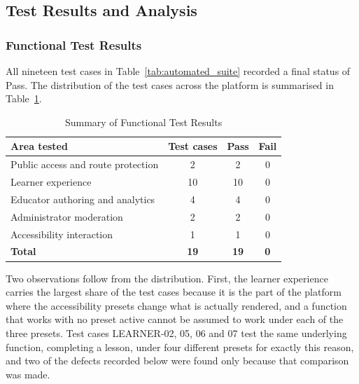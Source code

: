 \documentclass[12pt, oneside]{article} %
\begin{document}
\subsection{Test Results and Analysis}
\label{sec:test-results}

\subsubsection{Functional Test Results}

All nineteen test cases in Table~\ref{tab:automated_suite} recorded a final status of Pass. The distribution of the test cases across the platform is summarised in Table~\ref{tab:test_summary}.

\begin{table}[H]
\caption{Summary of Functional Test Results}
\label{tab:test_summary}
\vspace{-4mm}
\begin{center}
\renewcommand{\arraystretch}{1.2}
\footnotesize
\begin{tabular}{|>{\raggedright\arraybackslash}p{5.0cm}|c|c|c|}
\hline
\textbf{Area tested} & \textbf{Test cases} & \textbf{Pass} & \textbf{Fail} \\
\hline \hline
Public access and route protection & 2 & 2 & 0 \\ \hline
Learner experience & 10 & 10 & 0 \\ \hline
Educator authoring and analytics & 4 & 4 & 0 \\ \hline
Administrator moderation & 2 & 2 & 0 \\ \hline
Accessibility interaction & 1 & 1 & 0 \\ \hline
\textbf{Total} & \textbf{19} & \textbf{19} & \textbf{0} \\ \hline
\end{tabular}
\end{center}
\end{table}

Two observations follow from the distribution. First, the learner experience carries the largest share of the test cases because it is the part of the platform where the accessibility presets change what is actually rendered, and a function that works with no preset active cannot be assumed to work under each of the three presets. Test cases LEARNER-02, 05, 06 and 07 test the same underlying function, completing a lesson, under four different presets for exactly this reason, and two of the defects recorded below were found only because that comparison was made.
\end{document}
